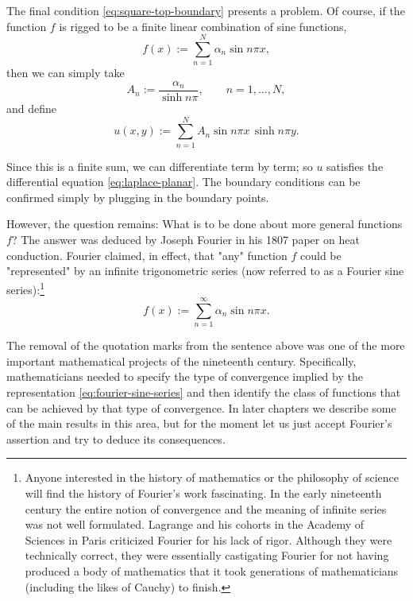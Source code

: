 The final condition \eqref{eq:square-top-boundary} presents a problem. Of course, if the function $f$ is rigged to be a finite linear combination of sine functions,
\begin{equation}\label{eq:finite-sine-boundary-data}
f(x):=\sum_{n=1}^N\alpha_n\sin n\pi x,
\end{equation}
then we can simply take
\begin{equation}\label{eq:finite-sine-solution-coefficients}
A_n:=\dfrac{\alpha_n}{\sinh n\pi},\qquad n=1,\ldots,N,
\end{equation}
and define
\begin{equation}\label{eq:finite-sine-square-solution}
u(x,y):=\sum_{n=1}^NA_n\sin n\pi x\,\sinh n\pi y.
\end{equation}


Since this is a finite sum, we can differentiate term by term; so $u$ satisfies the differential equation \eqref{eq:laplace-planar}. The boundary conditions can be confirmed simply by plugging in the boundary points.

However, the question remains: What is to be done about more general functions $f$? The answer was deduced by Joseph Fourier in his 1807 paper on heat conduction. Fourier claimed, in effect, that "any" function $f$ could be "represented" by an infinite trigonometric series (now referred to as a Fourier sine series):\footnote{Anyone interested in the history of mathematics or the philosophy of science will find the history of Fourier's work fascinating. In the early nineteenth century the entire notion of convergence and the meaning of infinite series was not well formulated. Lagrange and his cohorts in the Academy of Sciences in Paris criticized Fourier for his lack of rigor. Although they were technically correct, they were essentially castigating Fourier for not having produced a body of mathematics that it took generations of mathematicians (including the likes of Cauchy) to finish.}
\begin{equation}\label{eq:fourier-sine-series}
f(x):=\sum_{n=1}^{\infty}\alpha_n\sin n\pi x.
\end{equation}


The removal of the quotation marks from the sentence above was one of the more important mathematical projects of the nineteenth century. Specifically, mathematicians needed to specify the type of convergence implied by the representation \eqref{eq:fourier-sine-series} and then identify the class of functions that can be achieved by that type of convergence. In later chapters we describe some of the main results in this area, but for the moment let us just accept Fourier's assertion and try to deduce its consequences.

